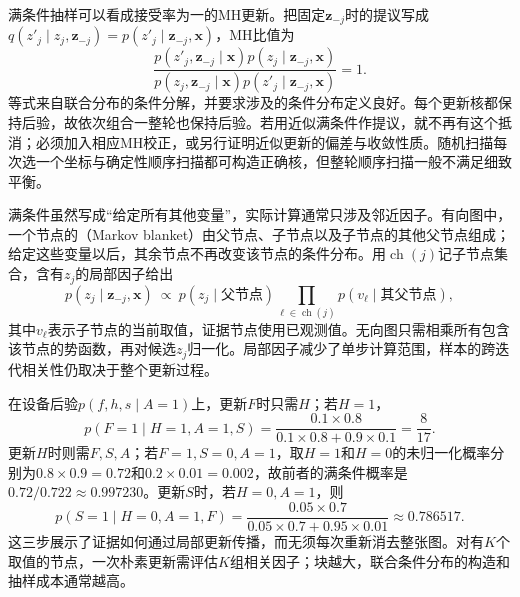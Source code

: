 满条件抽样可以看成接受率为一的MH更新。把固定$\bm{z}_{-j}$时的提议写成$q(z'_j\mid z_j,\bm{z}_{-j})=p(z'_j\mid\bm{z}_{-j},\bm{x})$，MH比值为
\begin{equation}
  \frac{p(z'_j,\bm{z}_{-j}\mid\bm{x})p(z_j\mid\bm{z}_{-j},\bm{x})}
       {p(z_j,\bm{z}_{-j}\mid\bm{x})p(z'_j\mid\bm{z}_{-j},\bm{x})}
    =1.
  \label{eq:pgm-sampling-gibbs-acceptance}
\end{equation}
等式来自联合分布的条件分解，并要求涉及的条件分布定义良好。每个更新核都保持后验，故依次组合一整轮也保持后验。若用近似满条件作提议，就不再有这个抵消；必须加入相应MH校正，或另行证明近似更新的偏差与收敛性质。随机扫描每次选一个坐标与确定性顺序扫描都可构造正确核，但整轮顺序扫描一般不满足细致平衡。

满条件虽然写成“给定所有其他变量”，实际计算通常只涉及邻近因子。有向图中，一个节点的（Markov blanket）由父节点、子节点以及子节点的其他父节点组成；给定这些变量以后，其余节点不再改变该节点的条件分布。用$\operatorname{ch}(j)$记子节点集合，含有$z_j$的局部因子给出
\[
  p(z_j\mid\bm{z}_{-j},\bm{x})
    \ \propto\ p(z_j\mid\text{父节点})
       \prod_{\ell\in\operatorname{ch}(j)}
          p(v_\ell\mid\text{其父节点}),
\]
其中$v_\ell$表示子节点的当前取值，证据节点使用已观测值。无向图只需相乘所有包含该节点的势函数，再对候选$z_j$归一化。局部因子减少了单步计算范围，样本的跨迭代相关性仍取决于整个更新过程。

在设备后验$p(f,h,s\mid A=1)$上，更新$F$时只需$H$；若$H=1$，
\[
  p(F=1\mid H=1,A=1,S)
    =\frac{0.1\times0.8}{0.1\times0.8+0.9\times0.1}
    =\frac{8}{17}.
\]
更新$H$时则需$F,S,A$；若$F=1,S=0,A=1$，取$H=1$和$H=0$的未归一化概率分别为$0.8\times0.9=0.72$和$0.2\times0.01=0.002$，故前者的满条件概率是$0.72/0.722\approx0.997230$。更新$S$时，若$H=0,A=1$，则
\[
  p(S=1\mid H=0,A=1,F)
    =\frac{0.05\times0.7}{0.05\times0.7+0.95\times0.01}
    \approx0.786517.
\]
这三步展示了证据如何通过局部更新传播，而无须每次重新消去整张图。对有$K$个取值的节点，一次朴素更新需评估$K$组相关因子；块越大，联合条件分布的构造和抽样成本通常越高。

